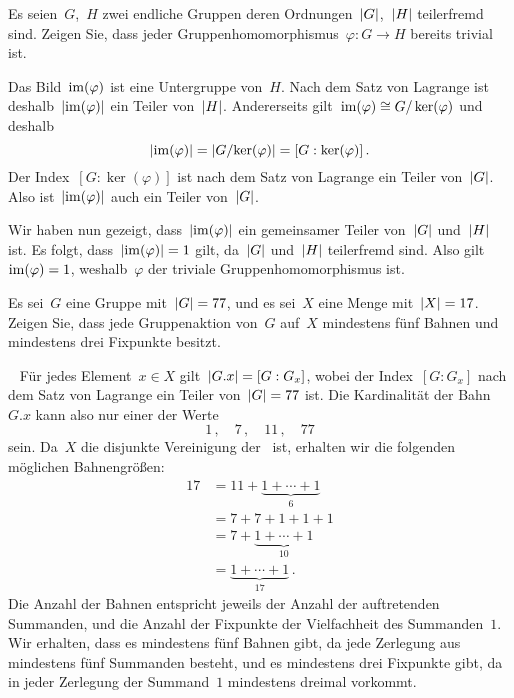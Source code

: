 \documentclass{scrartcl}
\begin{document}
\begin{exercise}
  Es seien~$G$,~$H$ zwei endliche Gruppen deren Ordnungen~$\lvert G\rvert$,~$\lvert H\rvert$ teilerfremd sind.
  Zeigen Sie, dass jeder Gruppenhomomorphismus~$\varphi \colon G \to H$ bereits trivial ist.
\end{exercise}

\begin{solution}
  Das Bild~$\operatorname{im}(\varphi)$ ist eine Untergruppe von~$H$.
  Nach dem Satz von Lagrange ist deshalb~$\lvert\operatorname{im}(\varphi)\rvert$ ein Teiler von~$\lvert H\rvert$.
  Andererseits gilt~$\operatorname{im}(\varphi) \cong G / \ker(\varphi)$ und deshalb
  \[
    \lvert \operatorname{im}(\varphi) \rvert
    =
    \lvert G / {\ker(\varphi)} \rvert
    =
    [G : \ker(\varphi)] \,.
  \]
  Der Index~$[G : \ker(\varphi)]$ ist nach dem Satz von Lagrange ein Teiler von~$\lvert G\rvert$.
  Also ist~$\lvert \operatorname{im}(\varphi) \rvert$ auch ein Teiler von~$\lvert G\rvert$.

  Wir haben nun gezeigt, dass~$\lvert \operatorname{im}(\varphi) \rvert$ ein gemeinsamer Teiler von~$\lvert G\rvert$ und~$\lvert H\rvert$ ist.
  Es folgt, dass~$\lvert \operatorname{im}(\varphi) \rvert = 1$ gilt, da~$\lvert G\rvert$ und~$\lvert H\rvert$ teilerfremd sind.
  Also gilt~$\operatorname{im}(\varphi) = 1$, weshalb~$\varphi$ der triviale Gruppenhomomorphismus ist.
\end{solution}

\begin{exercise}
  Es sei~$G$ eine Gruppe mit~$\lvert G\rvert = 77$, und es sei~$X$ eine Menge mit~$\lvert X\rvert = 17$.
  Zeigen Sie, dass jede Gruppenaktion von~$G$ auf~$X$ mindestens fünf Bahnen und mindestens drei Fixpunkte besitzt.
\end{exercise}

\begin{solution}~
  Für jedes Element~$x \in X$ gilt~$\lvert G.x\rvert = [G : G_x]$, wobei der Index~$[G : G_x]$ nach dem Satz von Lagrange ein Teiler von~$\lvert G\rvert = 77$ ist.
  Die Kardinalität der Bahn~$G.x$ kann also nur einer der Werte
  \[
    1 \,,
    \quad
    7 \,,
    \quad
    11 \,,
    \quad
    77
  \]
  sein.
  Da~$X$ die disjunkte Vereinigung der~ ist, erhalten wir die folgenden möglichen Bahnengrößen:
  \begin{align*}
    17
    &=
    11 + \underbrace{1 + \dotsb + 1}_{6}
    \\
    &=
    7 + 7 + 1 + 1 + 1
    \\
    &=
    7 + \underbrace{1 + \dotsb + 1}_{10}
    \\
    &=
    \underbrace{1 + \dotsb + 1}_{17} \,.
  \end{align*}
  Die Anzahl der Bahnen entspricht jeweils der Anzahl der auftretenden Summanden, und die Anzahl der Fixpunkte der Vielfachheit des Summanden~$1$.
  Wir erhalten, dass es mindestens fünf Bahnen gibt, da jede Zerlegung aus mindestens fünf Summanden besteht, und es mindestens drei Fixpunkte gibt, da in jeder Zerlegung der Summand~$1$ mindestens dreimal vorkommt.
\end{solution}
\end{document}
